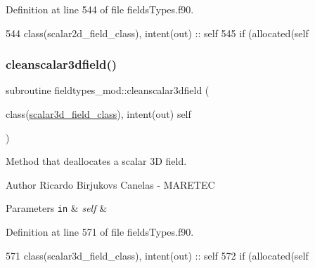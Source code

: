 Definition at line 544 of file fields\+Types.\+f90.


\begin{DoxyCode}
544     \textcolor{keywordtype}{class}(scalar2d\_field\_class), \textcolor{keywordtype}{intent(out)} :: self
545     \textcolor{keywordflow}{if} (\textcolor{keyword}{allocated}(self%
\end{DoxyCode}
\mbox{\label{namespacefieldtypes__mod_a9f3716bcbd2524ed608c86920cab8693}} 
\subsubsection{\texorpdfstring{cleanscalar3dfield()}{cleanscalar3dfield()}}
{\footnotesize\ttfamily subroutine fieldtypes\+\_\+mod\+::cleanscalar3dfield (\begin{DoxyParamCaption}\item[{class(\mbox{\hyperlink{structfieldtypes__mod_1_1scalar3d__field__class}{scalar3d\+\_\+field\+\_\+class}}), intent(out)}]{self }\end{DoxyParamCaption})\hspace{0.3cm}{\ttfamily [private]}}



Method that deallocates a scalar 3D field. 

\begin{DoxyAuthor}{Author}
Ricardo Birjukovs Canelas -\/ M\+A\+R\+E\+T\+EC 
\end{DoxyAuthor}

\begin{DoxyParams}[1]{Parameters}
\mbox{\tt in}  & {\em self} & \\
\hline
\end{DoxyParams}


Definition at line 571 of file fields\+Types.\+f90.


\begin{DoxyCode}
571     \textcolor{keywordtype}{class}(scalar3d\_field\_class), \textcolor{keywordtype}{intent(out)} :: self
572     \textcolor{keywordflow}{if} (\textcolor{keyword}{allocated}(self%
\end{DoxyCode}
\mbox{\label{namespacefieldtypes__mod_aaabae216913c347395d5e19ea2c22286}} 
